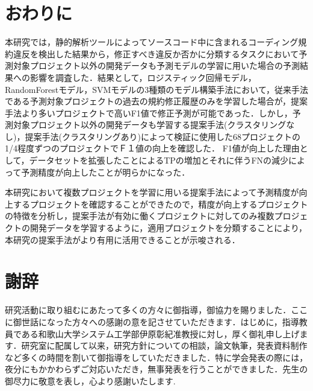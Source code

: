 \documentclass[11pt,dvipdfmx]{jreport}
\begin{document}
\chapter{おわりに}\label{chap:end}

本研究では，静的解析ツールによってソースコード中に含まれるコーディング規約違反を検出した結果から，修正すべき違反か否かに分類するタスクにおいて予測対象プロジェクト以外の開発データも予測モデルの学習に用いた場合の予測結果への影響を調査した．結果として，ロジスティック回帰モデル，RandomForestモデル，SVMモデルの3種類のモデル構築手法において，従来手法である予測対象プロジェクトの過去の規約修正履歴のみを学習した場合が，提案手法より多いプロジェクトで高いF1値で修正予測が可能であった．しかし，予測対象プロジェクト以外の開発データも学習する提案手法(クラスタリングなし)，提案手法(クラスタリングあり)によって検証に使用した68プロジェクトの1/4程度ずつのプロジェクトでＦ１値の向上を確認した．
F1値が向上した理由として，データセットを拡張したことによるTPの増加とそれに伴うFNの減少によって予測精度が向上したことが明らかになった．

本研究において複数プロジェクトを学習に用いる提案手法によって予測精度が向上するプロジェクトを確認することができたので，精度が向上するプロジェクトの特徴を分析し，提案手法が有効に働くプロジェクトに対してのみ複数プロジェクトの開発データを学習するように，適用プロジェクトを分類することにより，本研究の提案手法がより有用に活用できることが示唆される．



\chapter*{謝辞}\label{chap:thanks}

研究活動に取り組むにあたって多くの方々に御指導，御協力を賜りました．ここに御世話になった方々への感謝の意を記させていただきます．はじめに，指導教員である和歌山大学システム工学部伊原彰紀准教授に対し，厚く御礼申し上げます．研究室に配属して以来，研究方針についての相談，論文執筆，発表資料制作など多くの時間を割いて御指導をしていただきました．特に学会発表の際には，夜分にもかかわらずご対応いただき，無事発表を行うことができました．先生の御尽力に敬意を表し，心より感謝いたします.
\end{document}
